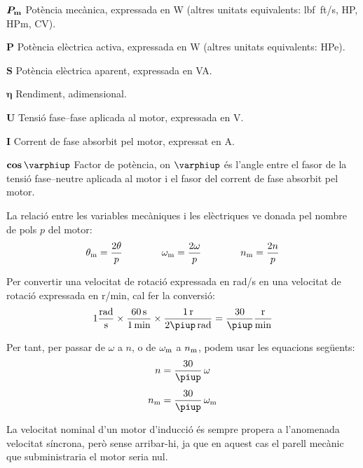 \begin{list}{}
   \item[$\boldsymbol{P_\mathrm{m}}$] Potència mecànica, expressada en \si{W} (altres unitats equivalents: \si{lbf.ft/s}, \si{HP},  \si{HPm}, \si{CV}).
   \item[$\boldsymbol{P}$] Potència elèctrica activa, expressada en \si{W} (altres unitats equivalents: \si{HPe}).
   \item[$\boldsymbol{S}$] Potència elèctrica aparent, expressada en \si{VA}.
   \item[$\boldsymbol{\eta}$] Rendiment, adimensional.
   \item[$\boldsymbol{U}$] Tensió fase--fase aplicada al motor, expressada en \si{V}.
   \item[$\boldsymbol{I}$] Corrent de fase absorbit pel motor, expressat en \si{A}.
   \item[$\boldsymbol{\cos\varphiup}$] Factor de potència, on $\varphiup$ és l'angle entre el fasor de la tensió fase--neutre aplicada al motor i el fasor del corrent de fase absorbit pel motor.
\end{list}

La relació entre les variables mecàniques i les elèctriques ve donada pel nombre de pols $p$ del motor:
\begin{equation}\label{eq:vel-ele-mec}
    \theta_\mathrm{m} = \frac{2\theta}{p} \qquad\qquad
    \omega_\mathrm{m} = \frac{2\omega}{p} \qquad\qquad
    n_\mathrm{m} = \frac{2n}{p}
\end{equation}

Per  convertir una velocitat de rotació expressada en \si{rad/s} en una velocitat de rotació expressada en \si{r/min}, cal fer la conversió:
\begin{equation}
 1\frac{\si{rad}}{\si{s}} \times \frac{\SI{60}{s}}{\SI{1}{min}} \times \frac{\SI{1}{r}}{2\piup\,\si{rad}} = \frac{30}{\piup}\frac{\si{r}}{\si{min}}
 \end{equation}

 Per tant, per passar de $\omega$ a $n$, o de $\omega_\mathrm{m}$ a $n_\mathrm{m}$, podem usar les equacions següents:
\begin{subequations}\index{motors d'inducció!velocitat}
\begin{align}
    n        &= \frac{30}{\piup} \,\omega \\[1ex]
    n\ped{m} &= \frac{30}{\piup} \,\omega\ped{m}
\end{align}
\end{subequations}

La velocitat nominal d'un motor d'inducció és sempre propera a l'anomenada velocitat síncrona, però sense arribar-hi, ja que en aquest cas el parell mecànic que subministraria el motor seria nul.

